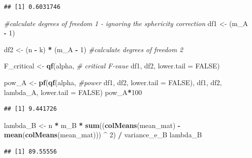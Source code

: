 \documentclass[]{book}
\newenvironment{Shaded}{\begin{snugshade}}{\end{snugshade}}
\newcommand{\CommentTok}[1]{\textcolor[rgb]{0.56,0.35,0.01}{\textit{#1}}}
\newcommand{\DataTypeTok}[1]{\textcolor[rgb]{0.13,0.29,0.53}{#1}}
\newcommand{\DecValTok}[1]{\textcolor[rgb]{0.00,0.00,0.81}{#1}}
\newcommand{\KeywordTok}[1]{\textcolor[rgb]{0.13,0.29,0.53}{\textbf{#1}}}
\newcommand{\NormalTok}[1]{#1}
\newcommand{\OperatorTok}[1]{\textcolor[rgb]{0.81,0.36,0.00}{\textbf{#1}}}
\newcommand{\OtherTok}[1]{\textcolor[rgb]{0.56,0.35,0.01}{#1}}
\newcommand{\StringTok}[1]{\textcolor[rgb]{0.31,0.60,0.02}{#1}}
\begin{document}
\begin{verbatim}
## [1] 0.6031746
\end{verbatim}

\begin{Shaded}
\begin{Highlighting}[]
\CommentTok{#calculate degrees of freedom 1 - ignoring the sphericity correction}
\NormalTok{df1 <-}\StringTok{ }\NormalTok{(m_A }\OperatorTok{-}\StringTok{ }\DecValTok{1}\NormalTok{) }

\NormalTok{df2 <-}\StringTok{ }\NormalTok{(n }\OperatorTok{-}\StringTok{ }\NormalTok{k) }\OperatorTok{*}\StringTok{ }\NormalTok{(m_A }\OperatorTok{-}\StringTok{ }\DecValTok{1}\NormalTok{) }\CommentTok{#calculate degrees of freedom 2}

\NormalTok{F_critical <-}\StringTok{ }\KeywordTok{qf}\NormalTok{(alpha, }\CommentTok{# critical F-vaue}
\NormalTok{                 df1,}
\NormalTok{                 df2, }
                 \DataTypeTok{lower.tail =} \OtherTok{FALSE}\NormalTok{) }

\NormalTok{pow_A <-}\StringTok{ }\KeywordTok{pf}\NormalTok{(}\KeywordTok{qf}\NormalTok{(alpha, }\CommentTok{#power }
\NormalTok{             df1, }
\NormalTok{             df2, }
             \DataTypeTok{lower.tail =} \OtherTok{FALSE}\NormalTok{), }
\NormalTok{          df1, }
\NormalTok{          df2, }
\NormalTok{          lambda_A, }
          \DataTypeTok{lower.tail =} \OtherTok{FALSE}\NormalTok{)}
\NormalTok{pow_A}\OperatorTok{*}\DecValTok{100}
\end{Highlighting}
\end{Shaded}

\begin{verbatim}
## [1] 9.441726
\end{verbatim}

\begin{Shaded}
\begin{Highlighting}[]
\NormalTok{lambda_B <-}
\StringTok{  }\NormalTok{n }\OperatorTok{*}\StringTok{ }\NormalTok{m_B }\OperatorTok{*}\StringTok{ }\KeywordTok{sum}\NormalTok{((}\KeywordTok{colMeans}\NormalTok{(mean_mat) }\OperatorTok{-}\StringTok{ }
\StringTok{                   }\KeywordTok{mean}\NormalTok{(}\KeywordTok{colMeans}\NormalTok{(mean_mat))) }\OperatorTok{^}\StringTok{ }\DecValTok{2}\NormalTok{) }\OperatorTok{/}\StringTok{ }\NormalTok{variance_e_B }
\NormalTok{lambda_B}
\end{Highlighting}
\end{Shaded}

\begin{verbatim}
## [1] 89.55556
\end{verbatim}
\end{document}
